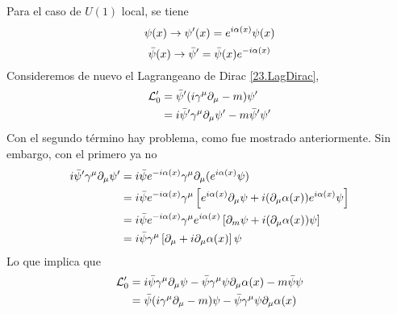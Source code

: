 Para el caso de $U(1)$ local, se tiene
\begin{equation}
  \psi(x)\to \psi'(x)=e^{i\alpha (x)}\psi(x)
\end{equation}
\begin{equation}
  \bar{\psi}(x)\to \bar{\psi}'=\bar{\psi}(x)e^{-i\alpha (x)}
\end{equation}
Consideremos de nuevo el Lagrangeano de Dirac \eqref{23.LagDirac},
\begin{align}
  \mathcal{L}'_0&=\bar{\psi}'(i\gamma^\mu \partial_\mu -m)\psi'\\
  &=i\bar{\psi}'\gamma^\mu \partial_\mu \psi'-m\bar{\psi}'\psi'
\end{align}
Con el segundo término hay problema, como fue mostrado anteriormente. Sin embargo, con el primero ya no
\begin{align}
  i\bar{\psi}'\gamma^\mu \partial_\mu \psi'&=i\bar{\psi}e^{-i\alpha (x)}\gamma^\mu \partial_\mu (e^{i\alpha (x)}\psi)\\
  &=i\bar{\psi}e^{-i\alpha (x)}\gamma^\mu \left[e^{i\alpha (x)}\partial_\mu \psi+i(\partial_\mu \alpha(x))e^{i\alpha (x)}\psi\right]\\
  &=i\bar{\psi}e^{-i\alpha (x)}\gamma^\mu e^{i\alpha (x)}\left[\partial_m\psi +i (\partial_\mu \alpha(x))\psi\right]\\
  &=i\bar{\psi}\gamma^\mu \left[\partial_\mu +i\partial_\mu \alpha (x)\right]\psi
\end{align}
Lo que implica que
\begin{align}
  \mathcal{L}'_0 &=i\bar{\psi}\gamma^\mu \partial_\mu \psi-\bar{\psi}\gamma^\mu \psi\partial_\mu \alpha(x)-m\bar{\psi}\psi\\
  &=\bar{\psi}(i\gamma^\mu \partial_\mu -m)\psi-\bar{\psi}\gamma^\mu \psi\partial_\mu \alpha(x)
\end{align}



















































